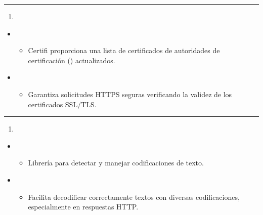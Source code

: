 \documentclass[a4paper,10pt,oneside,spanish,openany]{sphinxmanual}
\begin{document}
\bigskip\hrule\bigskip

\begin{enumerate}
%
\setcounter{enumi}{2}
\item {} 
\sphinxAtStartPar
{}

\end{enumerate}
\begin{itemize}
\item {} 
\sphinxAtStartPar
{}
\begin{itemize}
\item {} 
\sphinxAtStartPar
Certifi proporciona una lista de certificados de autoridades de certificación () actualizados.

\end{itemize}

\item {} 
\sphinxAtStartPar
{}
\begin{itemize}
\item {} 
\sphinxAtStartPar
Garantiza solicitudes HTTPS seguras verificando la validez de los certificados SSL/TLS.

\end{itemize}

\end{itemize}


\bigskip\hrule\bigskip

\begin{enumerate}
%
\setcounter{enumi}{3}
\item {} 
\sphinxAtStartPar
{}

\end{enumerate}
\begin{itemize}
\item {} 
\sphinxAtStartPar
{}
\begin{itemize}
\item {} 
\sphinxAtStartPar
Librería para detectar y manejar codificaciones de texto.

\end{itemize}

\item {} 
\sphinxAtStartPar
{}
\begin{itemize}
\item {} 
\sphinxAtStartPar
Facilita decodificar correctamente textos con diversas codificaciones, especialmente en respuestas HTTP.

\end{itemize}

\end{itemize}
\end{document}

